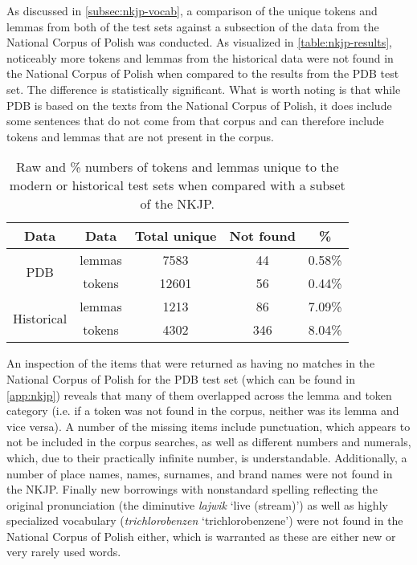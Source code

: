 As discussed in \autoref{subsec:nkjp-vocab}, a comparison of the unique tokens and lemmas from both of the test sets against a subsection of the data from the National Corpus of Polish was conducted. As visualized in \autoref{table:nkjp-results}, noticeably more tokens and lemmas from the historical data were not found in the National Corpus of Polish when compared to the results from the PDB test set. The difference is statistically significant. What is worth noting is that while PDB is based on the texts from the National Corpus of Polish, it does include some sentences that do not come from that corpus and can therefore include tokens and lemmas that are not present in the corpus. 

\renewcommand{\arraystretch}{1.25}
\begin{table}[H]
\begin{center}
\begin{tabular}{|cc|c|c|c|}
\hline \bf Data & \bf Data & \bf Total unique & \bf Not found & \bf \% \\ \hline
\multirow{2}{4em}{PDB}
& lemmas & 7583 & 44 & 0.58\%  \\
& tokens & 12601 & 56 & 0.44\%  \\
\multirow{2}{4em}{Historical}
& lemmas & 1213 & 86 & 7.09\%  \\
& tokens & 4302 & 346 & 8.04\% \\ 
\hline
\end{tabular}
\caption{\label{table:nkjp-results} Raw and \% numbers of tokens and lemmas unique to the modern or historical test sets when compared with a subset of the NKJP.}
\end{center}
\end{table}

An inspection of the items that were returned as having no matches in the National Corpus of Polish for the PDB test set (which can be found in \autoref{app:nkjp}) reveals that many of them overlapped across the lemma and token category (i.e. if a token was not found in the corpus, neither was its lemma and vice versa). A number of the missing items include punctuation, which appears to not be included in the corpus searches, as well as different numbers and numerals, which, due to their practically infinite number, is understandable. Additionally, a number of place names, names, surnames, and brand names were not found in the NKJP. Finally new borrowings with nonstandard spelling reflecting the original pronunciation (the diminutive \textit{lajwik} `live (stream)') as well as highly specialized vocabulary (\textit{trichlorobenzen} `trichlorobenzene') were not found in the National Corpus of Polish either, which is warranted as these are either new or very rarely used words.

